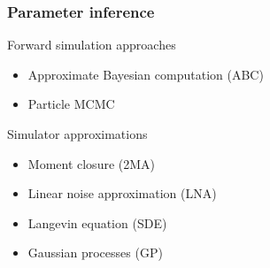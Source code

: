 \documentclass[t,compress]{beamer}
\begin{document}
\begin{frame}
\frametitle{Parameter inference}

\begin{block}{Forward simulation approaches}
\begin{itemize}
\item Approximate Bayesian computation (ABC)
\item Particle MCMC
\end{itemize}
\end{block}

\begin{block}{Simulator approximations}
\begin{itemize}
\item Moment closure (2MA)
\item Linear noise approximation (LNA)
\item Langevin equation (SDE)
\item Gaussian processes (GP)
\end{itemize}
\end{block}


\end{frame}
\end{document}
